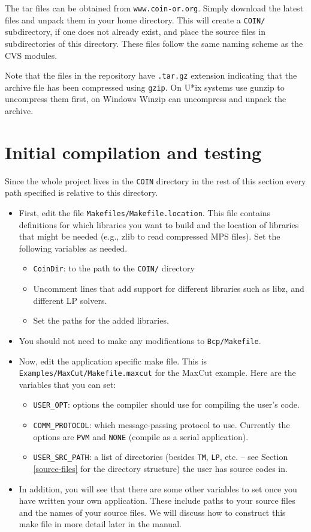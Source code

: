 The tar files can be obtained from {\tt www.coin-or.org}. Simply
download the latest files and unpack them in your home directory.
This will create a {\tt COIN/} subdirectory, if one does not already
exist, and place the source files in subdirectories of this directory.
These files follow the same naming scheme as the CVS modules.

Note that the files in the repository have {\tt .tar.gz} extension 
indicating that the archive file has been compressed using {\tt gzip}. On 
U*ix systems use gunzip to uncompress them first, on Windows Winzip can
uncompress and unpack the archive.

\section{Initial compilation and testing}

Since the whole project lives in the {\tt COIN} directory in the rest of this
section every path specified is relative to this directory.

\begin{itemize}
\item First, edit the file {\tt Makefiles/Makefile.location}. This file 
   contains definitions for which libraries you want to build and
   the location of libraries that might be needed (e.g., zlib to read
   compressed MPS files). Set the following variables as needed.
  \begin{itemize}
  \item {\tt CoinDir}: to the path to the {\tt COIN/} directory
  \item Uncomment lines that add support for different libraries 
    such as libz, and different LP solvers.
  \item Set the paths for the added libraries. 
  \end{itemize}
\item You should not need to make any modifications to 
  {\tt Bcp/Makefile}. 
\item Now, edit the application specific make file. This
  is {\tt Examples/MaxCut/Makefile.maxcut} for the MaxCut example. 
  Here are the variables that you can set:
  \begin{itemize}
  \item {\tt USER\_OPT}: options the compiler should use
    for compiling the user's code.
  \item {\tt COMM\_PROTOCOL}: which message-passing
    protocol to use. Currently the options are {\tt PVM} and {\tt NONE}
    (compile as a serial application). 
  \item {\tt USER\_SRC\_PATH}: a list of directories (besides {\tt TM}, 
    {\tt LP}, etc. -- see Section \ref{source-files} for the directory
    structure) the user has source codes in.
  \end{itemize}
\item In addition, you will see that there are some other
  variables to set once you have written your own application. These
  include paths to your source files and the names of your source files.
  We will discuss how to construct this make file in more detail later
  in the manual. 
\end{itemize}
        
